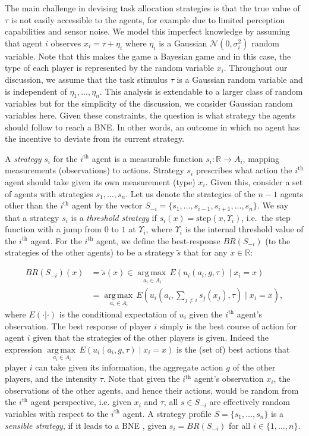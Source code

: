 \documentclass[defaultstyle,12pt]{thesis}
\DeclareMathOperator*{\argmaxop}{arg\,max\,}
\newcommand{\argmax}[1]{\underset{#1}{\argmaxop}}
\newcommand{\R}{\mathbb{R}}    %
\newcommand{\td}{\Upsilon}   %
\begin{document}
The main challenge in devising task allocation strategies is that the true value of $\tau$ is not easily accessible to the agents, for example due to limited perception capabilities and sensor noise.
We model this imperfect knowledge by assuming that agent $i$ observes $x_i=\tau+\eta_i$ where $\eta_i$ is a Gaussian $\mathcal{N}(0,\sigma_i^2)$ random variable. Note that this makes the game a Bayesian game and in this case, the type of each player is represented by the random variable $x_i$. Throughout our discussion, we assume that the task stimulus $\tau$ is a Gaussian random variable and is independent of $\eta_1,\ldots,\eta_n$. This analysis is extendable to a larger class of random variables but for the simplicity of the discussion, we consider Gaussian random variables here. Given these constraints, the question is what strategy the agents should follow to reach a BNE. In other words, an outcome in which no agent has the incentive to deviate from its current strategy.

A \emph{strategy} $s_i$ for the $i^{\text{th}}$ agent is a measurable function $s_i:\R\to A_i$, mapping measurements (observations) to actions. Strategy $s_i$ prescribes what action the $i^{\text{th}}$ agent should take given its own measurement (type) $x_i$. Given this, consider a set of agents with strategies $s_1,\ldots,s_n$. Let us denote the strategies of the $n-1$ agents other than the $i^{\text{th}}$ agent by the vector $S_{-i}=\{s_1,\ldots,s_{i-1},s_{i+1},\ldots,s_n\}$.  We say that a strategy $s_i$ is a \emph{threshold strategy} if $s_i(x)=\text{step}(x, \td_i)$, i.e.\ the step function with a jump from $0$ to $1$ at $\td_i$, where $\td_i$ is the internal threshold value of the $i^{\text{th}}$ agent. For the $i^{\text{th}}$ agent, we define the best-response $BR(S_{-i})$ (to the strategies of the other agents) to be a strategy $\tilde{s}$ that for any $x\in \R$:

\begin{align}\label{eqn:BR}
BR(S_{-i})(x)&=\tilde{s}(x)\in\argmax{a_i\in A_i} E(u_i(a_i,g,\tau)\mid x_i=x)\\
&=\argmax{a_i\in A_i} E(u_i(a_i,\sum_{j\not=i}s_j(x_j),\tau)\mid x_i=x),
\end{align}
where $E(\cdot|\cdot)$ is the conditional expectation of $u_i$ given the $i^{\text{th}}$ agent's observation. The best response of player $i$ simply is the best course of action for agent $i$ given that the strategies of the other players is given. Indeed the expression $\argmax{a_i\in A_i} E(u_i(a_i,g,\tau)\mid x_i=x)$ is the (set of) best actions that player $i$ can take given its information, the aggregate action $g$ of the other players, and the intensity $\tau$. Note that given the $i^{\text{th}}$ agent's observation $x_i$, the observations of the other agents, and hence their actions, would be random from the $i^{\text{th}}$ agent perspective, i.e. given $x_i$ and $\tau$, all $s \in S_{-i}$ are effectively random variables with respect to the $i^{\text{th}}$ agent. A strategy profile $S=\{s_1,\ldots,s_n\}$ is a \emph{sensible strategy}, if it leads to a BNE \cite{Fudenberg1998}, given $s_i=BR(S_{-i})$ for all $i\in \{1,\ldots,n\}$. 
\end{document}
